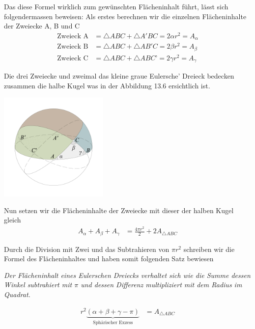 \begin{refsection}
Das diese Formel wirklich zum gewünschten Flächeninhalt führt, lässt sich folgendermassen beweisen:
Als erstes berechnen wir die einzelnen Flächeninhalte der Zweiecke A, B und C
\begin{align*}
\text{Zweieck A}
&=
\triangle{ABC} + \triangle{A'BC} = 2 \alpha r^{ 2 } = A_{ \alpha }\\
\text{Zweieck B}
&=
\triangle{ABC} + \triangle{AB'C} = 2 \beta r^{ 2 } = A_{ \beta }\\
\text{Zweieck C}
&=
\triangle{ABC} + \triangle{ABC’} = 2 \gamma r^{ 2 } = A_{ \gamma }
\end{align*}

Die drei Zweiecke und zweimal das kleine graue Eulersche’ Dreieck bedecken zusammen  die halbe Kugel was in der Abbildung 13.6 ersichtlich ist.

\begin{center}
        \includegraphics[width=0.4\textwidth]{kugel/HalbeKugel.jpg}
\end{center}

Nun setzen wir die Flächeninhalte der Zweiecke mit dieser der halben Kugel gleich
\begin{align*}
A_{ \alpha } + A_{ \beta } + A_{ \gamma } &= \frac{ 4\pi r^{ 2 } }{ 2 } + 2A_{ \triangle{ ABC }}
\end{align*}

Durch die Division mit Zwei und das Subtrahieren von $\pi r^2$ schreiben wir die Formel des Flächeninhaltes und haben somit folgenden Satz bewiesen
\begin{satz} \textit{Der Flächeninhalt eines Eulerschen Dreiecks verhaltet sich wie die Summe dessen Winkel subtrahiert mit $\pi$ und dessen Differenz multipliziert mit dem Radius im Quadrat.}
\label{skript:kugel:satz:Flaecheninhalt}
\end{satz}

\begin{align*}
r^{ 2 }\underbrace{(\alpha + \beta + \gamma - \pi)}_{\text{Sphärischer Exzess}} &= A_{ \triangle{ ABC }}  
\end{align*}


\end{refsection}
